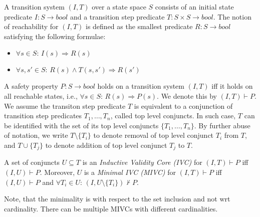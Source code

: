 A transition system $(I,T)$ over a state space $S$ consists of an initial state predicate $I : S \rightarrow bool$ and a transition step predicate $T : S \times S \rightarrow bool$. The notion of reachability for $(I, T)$ is defined as the smallest predicate $R : S \rightarrow bool$ satisfying the following formulae:

\begin{itemize}
	\item[] $\forall s \in S: \, I(s) \Rightarrow R(s)$
	\item[] $\forall s, s' \in S: \, R(s) \wedge T(s, s') \Rightarrow R(s')$
\end{itemize}

A safety property $P: S \rightarrow bool$ holds on a transition system $(I, T)$ iff it holds on all reachable states, i.e., $\forall s \in S: \, R(s) \Rightarrow P(s)$. We denote this by $(I, T) \vdash P$. We assume
the transiton step predicate $T$ is equivalent to   a conjunction of transition step predicates $T_1, \ldots, T_n$,  called top level conjuncts.
In such case, $T$ can be identified with the set of its top level conjuncts $\{ T_1, \ldots, T_n\}$. By further abuse of notation, we write $T \setminus \{ T_i \}$ to denote removal of top level conjunct $T_i$ from $T$, and $T \cup \{ T_j\}$ to denote addition of top level conjunct $T_j$ to $T$.


\begin{definition}
A set of conjuncts $U \subseteq T$ is an \emph{ Inductive Validity Core (IVC)} for $(I, T) \vdash P$ iff $(I, U) \vdash P$. Moreover, $U$ is a \emph{Minimal IVC (MIVC)} for $(I, T) \vdash P$ iff $(I, U) \vdash P$ and $\forall T_i \in U: \, (I, U \setminus \{ T_i\}) \nvdash P$.
\end{definition}

Note, that the minimality is with respect to the set inclusion and not wrt cardinality. There can be multiple MIVCs with different cardinalities.






